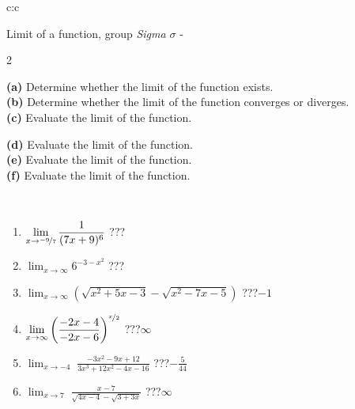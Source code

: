 \documentclass[10pt]{report}
\begin{document}
\newpage
\thispagestyle{empty}
\begin{tabular}{c:c}
\begin{minipage}[c][104.5mm][t]{0.5\linewidth}
\begin{center}
\vspace{5mm}
{\huge Limit of a function, group \textit{Sigma $\sigma$} -}\\[5mm]
\begin{minipage}{0.95\linewidth}
\begin{center}
{\small \begin{multicols}{2} \raggedright
\textbf{(a)} Determine whether the limit of the function exists. \\[1mm]
\textbf{(b)} Determine whether the limit of the function converges or diverges. \\[1mm]
\textbf{(c)} Evaluate the limit of the function. \par \columnbreak
\textbf{(d)} Evaluate the limit of the function. \\[1mm]
\textbf{(e)} Evaluate the limit of the function. \\[1mm]
\textbf{(f)} Evaluate the limit of the function. \\[1mm]
\end{multicols}
}
\end{center}
\end{minipage}
\\[1mm]
\begin{minipage}{0.79\linewidth}
\begin{center}
\begin{varwidth}{\linewidth}
\setlength{\itemsep}{0pt}
\begin{enumerate}
\normalsize
\item $\displaystyle\lim_{x\to\nicefrac{-9}{7}}{\frac{1}{(7x+9)^{6}}}$\quad \dotfill\; ???\;\dotfill \quad {}
\item $\displaystyle\lim_{x\to\infty}{6^{-3-x^2}}$\quad \dotfill\; ???\;\dotfill \quad {}
\item $\displaystyle\lim_{x\to\infty}{\left(\sqrt{x^2+5x-3} - \sqrt{x^2-7x-5}\right)}$\quad \dotfill\; ???\;\dotfill \quad $-1$
\item $\displaystyle\lim_{x\to\infty}{\left( \frac{-2x-4}{-2x-6} \right)^{\nicefrac{x}{2}}}$\quad \dotfill\; ???\;\dotfill \quad $\infty$
\item $\displaystyle\lim_{x\to -4}{\;\frac{-3x^2-9x+12}{3x^3+12x^2-4x-16}}$\quad \dotfill\; ???\;\dotfill \quad $-\frac{5}{44}$
\item $\displaystyle\lim_{x\to 7}{\;\frac{x-7}{\sqrt{4x-4} - \sqrt{3+3x}}}$\quad \dotfill\; ???\;\dotfill \quad $\infty$

\end{enumerate}
\end{varwidth}
\end{center}
\end{minipage}
\end{center}
\end{minipage}
\end{tabular}
\end{document}
